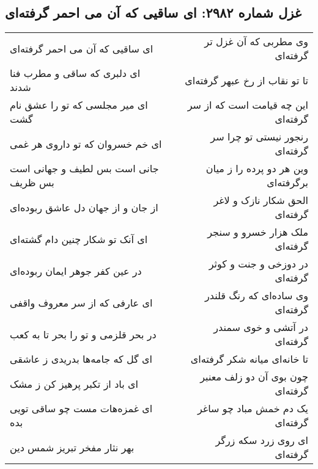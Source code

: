 \begin{center}
\section*{غزل شماره ۲۹۸۲: ای ساقیی که آن می احمر گرفته‌ای}
\label{sec:2982}
\begin{longtable}{l p{0.5cm} r}
ای ساقیی که آن می احمر گرفته‌ای
&&
وی مطربی که آن غزل تر گرفته‌ای
\\
ای دلبری که ساقی و مطرب فنا شدند
&&
تا تو نقاب از رخ عبهر گرفته‌ای
\\
ای میر مجلسی که تو را عشق نام گشت
&&
این چه قیامت است که از سر گرفته‌ای
\\
ای خم خسروان که تو داروی هر غمی
&&
رنجور نیستی تو چرا سر گرفته‌ای
\\
جانی است بس لطیف و جهانی است بس ظریف
&&
وین هر دو پرده را ز میان برگرفته‌ای
\\
از جان و از جهان دل عاشق ربوده‌ای
&&
الحق شکار نازک و لاغر گرفته‌ای
\\
ای آنک تو شکار چنین دام گشته‌ای
&&
ملک هزار خسرو و سنجر گرفته‌ای
\\
در عین کفر جوهر ایمان ربوده‌ای
&&
در دوزخی و جنت و کوثر گرفته‌ای
\\
ای عارفی که از سر معروف واقفی
&&
وی ساده‌ای که رنگ قلندر گرفته‌ای
\\
در بحر قلزمی و تو را بحر تا به کعب
&&
در آتشی و خوی سمندر گرفته‌ای
\\
ای گل که جامه‌ها بدریدی ز عاشقی
&&
تا خانه‌ای میانه شکر گرفته‌ای
\\
ای باد از تکبر پرهیز کن ز مشک
&&
چون بوی آن دو زلف معنبر گرفته‌ای
\\
ای غمزه‌هات مست چو ساقی تویی بده
&&
یک دم خمش مباد چو ساغر گرفته‌ای
\\
بهر نثار مفخر تبریز شمس دین
&&
ای روی زرد سکه زرگر گرفته‌ای
\\
\end{longtable}
\end{center}
